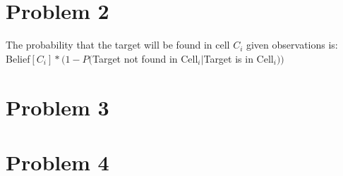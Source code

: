 \documentclass[12pt]{report}
\begin{document}
\section{Problem 2}
The probability that the target will be found in cell $C_{i}$ given observations is:\\
Belief$[C_{i}]*(1-P($Target not found in Cell$_{i}|$Target is in Cell$_{i}))$


\section{Problem 3}


\section{Problem 4}
\end{document}
